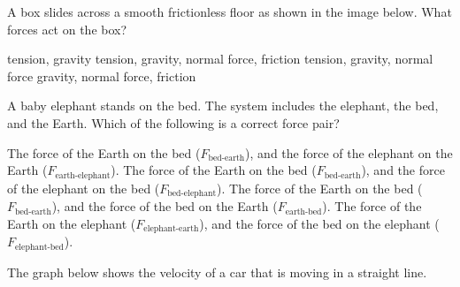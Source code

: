 \documentclass[]{exam}
\begin{document}
\begin{questions}

\question %
A box slides across a smooth frictionless floor as shown in the image below.  What forces act on the box?

\begin{center}
\end{center}


\begin{randomizechoices}[norandomize]
    \choice tension, gravity
    \choice tension, gravity, normal force, friction
    \correctchoice tension, gravity, normal force
    \choice gravity, normal force, friction
\end{randomizechoices}

\question 
A baby elephant stands on the bed. The system includes the elephant, the bed, and the Earth. Which of the following is a correct force pair?

\begin{center}
\end{center}

\begin{randomizechoices}[norandomize]
    \choice The force of the Earth on the bed ($F_\text{bed-earth}$), and the force of the elephant on the Earth ($F_\text{earth-elephant}$).
    \choice The force of the Earth on the bed ($F_\text{bed-earth}$), and the force of the elephant on the bed ($F_\text{bed-elephant}$).
    \correctchoice The force of the Earth on the bed ($F_\text{bed-earth}$), and the force of the bed on the Earth ($F_\text{earth-bed}$).
    \choice The force of the Earth on the elephant ($F_\text{elephant-earth}$), and the force of the bed on the elephant ($F_\text{elephant-bed}$).
    
\end{randomizechoices}


\question
The graph below shows the velocity of a car that is moving in a straight line.


\end{questions}
\end{document}
